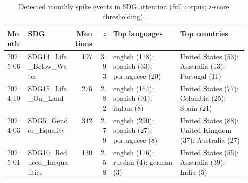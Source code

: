\begin{table}[H]
\centering
\caption{Detected monthly spike events in SDG attention (full corpus; z-score thresholding).}
\label{tab:spike_events}
\begin{tabular}{llrrp{0.28\linewidth}p{0.28\linewidth}}
\toprule
Month & SDG & Mentions & $z$ & Top languages & Top countries \\
\midrule
2025-06 & SDG14\_Life\_Below\_Water & 197 & 3.93 & english (118); spanish (33); portuguese (20) & United States (53); Australia (13); Portugal (11) \\
2024-10 & SDG15\_Life\_On\_Land & 276 & 2.82 & english (164); spanish (91); italian (8) & United States (77); Colombia (25); Spain (21) \\
2024-03 & SDG5\_Gender\_Equality & 342 & 2.79 & english (290); spanish (27); portuguese (8) & United States (88); United Kingdom (37); Australia (27) \\
2025-01 & SDG10\_Reduced\_Inequalities & 130 & 2.58 & english (116); russian (4); german (3) & United States (55); Australia (39); India (5) \\
\bottomrule
\end{tabular}
\end{table}

